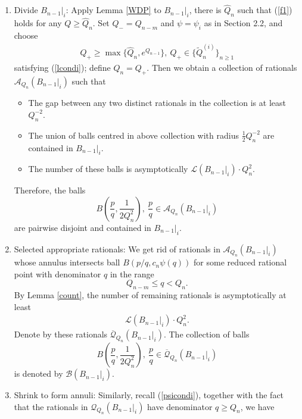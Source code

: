 \documentclass[11pt]{amsart}
\numberwithin{equation}{section}
\newcommand{\0}{\mathbf{0}}
\theoremstyle{remark}
\begin{document}
{\begin{enumerate}
    \item {Divide $B_{n-1}\vert_i$}:
    Apply Lemma \ref{WDP} to $B_{n-1}\vert_i$, there is $\widehat{Q}_n$ such that (\ref{f1}) holds for any $Q\ge \widehat{Q}_n$. Set $Q_-=Q_{n-m}$ and $\psi=\psi_i$ as in Section 2.2, and choose
    \begin{align}\label{choiceQn}
Q_+\ge \max\{\widehat{Q}_n,e^{Q_{n-1}}\},\ Q_+\in\{\widetilde{Q}_n^{(i)}\}_{n\ge 1}
\end{align}
satisfying (\ref{lcondi}); define $Q_n=Q_+$. Then we obtain a collection of rationals $\mathcal{A}_{Q_n}(B_{n-1}\vert_i)$ such that
        \begin{itemize}
  \item The gap between any two distinct rationals in the collection is at least $Q_n^{-2}$.
     \item The union of balls centred in above collection with radius $\frac{1}{2}Q_n^{-2}$ are contained in $B_{n-1}\vert_i$.
    \item The number of these balls is asymptotically $\mathcal{L}(B_{n-1}\vert_i)\cdot Q_n^{2}$.
\end{itemize}
 Therefore, the balls $$B\left(\frac{p}{q},\frac{1}{2Q_n^2}\right),\ \frac{p}{q}\in \mathcal{A}_{Q_n}(B_{n-1}\vert_i)$$
 are pairwise disjoint and contained in $B_{n-1}\vert_i$.
    \item {Selected appropriate rationals}: We get rid of rationals in $\mathcal{A}_{Q_n}(B_{n-1}\vert_i)$ whose annulus intersects ball $B(p/q,c_n\psi(q))$ for some reduced rational point with denominator $q$ in the range $$Q_{n-m}\le q< Q_n.$$ %
        By Lemma \ref{count}, the number of remaining rationals is asymptotically at least
    \begin{align*}
   \mathcal{L}(B_{n-1}\vert_i)\cdot Q_n^2.
\end{align*}
    Denote by these rationals $\overline{\mathcal{Q}}_{Q_n}(B_{n-1}\vert_i)$. The collection of balls
$$B\left(\frac{p}{q},\frac{1}{2Q_n^2}\right),\ \frac{p}{q}\in \overline{\mathcal{Q}}_{Q_n}(B_{n-1}\vert_i)$$
is denoted by $\mathcal{B}(B_{n-1}\vert_i)$.
    \item Shrink to form annuli: Similarly, recall (\ref{psicondi}), together with the fact that the rationals in $\mathcal{Q}_{Q_n}(B_{n-1}\vert_i)$ have denominator $q\ge Q_n$, we have

\end{enumerate}}
\end{document}

